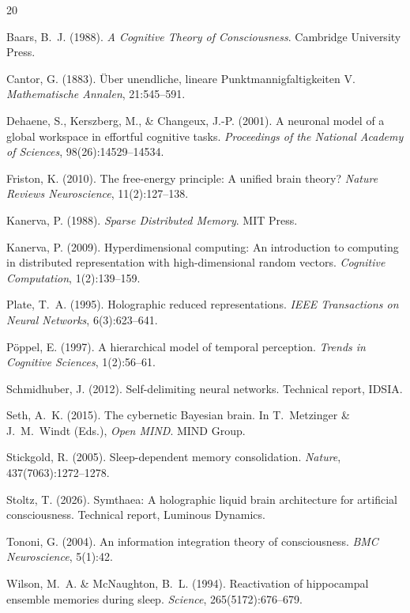 \documentclass[11pt,a4paper]{article}
\begin{document}

\begin{thebibliography}{20}

Baars, B.~J. (1988).
\newblock \emph{A Cognitive Theory of Consciousness}.
\newblock Cambridge University Press.

Cantor, G. (1883).
\newblock \"{U}ber unendliche, lineare Punktmannigfaltigkeiten V.
\newblock \emph{Mathematische Annalen}, 21:545--591.

Dehaene, S., Kerszberg, M., \& Changeux, J.-P. (2001).
\newblock A neuronal model of a global workspace in effortful cognitive tasks.
\newblock \emph{Proceedings of the National Academy of Sciences}, 98(26):14529--14534.

Friston, K. (2010).
\newblock The free-energy principle: A unified brain theory?
\newblock \emph{Nature Reviews Neuroscience}, 11(2):127--138.

Kanerva, P. (1988).
\newblock \emph{Sparse Distributed Memory}.
\newblock MIT Press.

Kanerva, P. (2009).
\newblock Hyperdimensional computing: An introduction to computing in distributed representation with high-dimensional random vectors.
\newblock \emph{Cognitive Computation}, 1(2):139--159.

Plate, T.~A. (1995).
\newblock Holographic reduced representations.
\newblock \emph{IEEE Transactions on Neural Networks}, 6(3):623--641.

P\"{o}ppel, E. (1997).
\newblock A hierarchical model of temporal perception.
\newblock \emph{Trends in Cognitive Sciences}, 1(2):56--61.

Schmidhuber, J. (2012).
\newblock Self-delimiting neural networks.
\newblock Technical report, IDSIA.

Seth, A.~K. (2015).
\newblock The cybernetic Bayesian brain.
\newblock In T.~Metzinger \& J.~M.~Windt (Eds.), \emph{Open MIND}. MIND Group.

Stickgold, R. (2005).
\newblock Sleep-dependent memory consolidation.
\newblock \emph{Nature}, 437(7063):1272--1278.

Stoltz, T. (2026).
\newblock Symthaea: A holographic liquid brain architecture for artificial consciousness.
\newblock Technical report, Luminous Dynamics.

Tononi, G. (2004).
\newblock An information integration theory of consciousness.
\newblock \emph{BMC Neuroscience}, 5(1):42.

Wilson, M.~A. \& McNaughton, B.~L. (1994).
\newblock Reactivation of hippocampal ensemble memories during sleep.
\newblock \emph{Science}, 265(5172):676--679.

\end{thebibliography}
\end{document}
